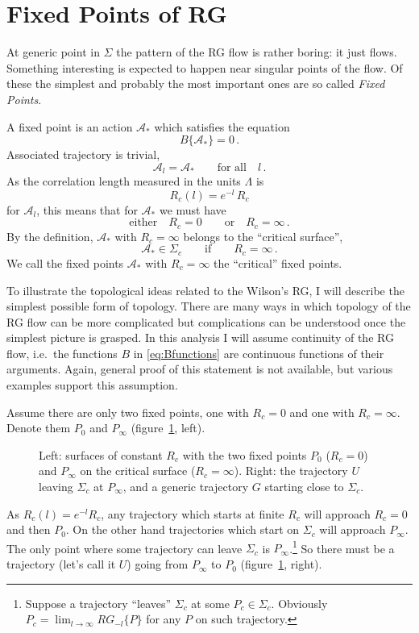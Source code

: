 \section{Fixed Points of RG}

At generic point in $\Sigma$ the pattern of the RG flow is rather boring: it just
flows. Something interesting is expected to happen near singular points of the
flow. Of these the simplest and probably the most important ones are so called
\emph{Fixed Points}.

A fixed point is an action $\mathcal A_*$ which satisfies the equation
\[
B\{\mathcal A_*\}=0\,.
\]
Associated trajectory is trivial,
\[
\mathcal A_l=\mathcal A_*\qquad\text{for all}\quad l\,.
\]
As the correlation length measured in the units $\Lambda$ is
\[
R_c(l)=e^{-l}\,R_c
\]
for $\mathcal A_l$, this means that for $\mathcal A_*$ we must have
\[
\text{either}\quad R_c=0\qquad\text{or}\quad R_c=\infty\,.
\]
By the definition, $\mathcal A_*$ with $R_c=\infty$ belongs to the ``critical
surface'',
\[
\mathcal A_*\in\Sigma_c\qquad\text{if}\qquad R_c=\infty\,.
\]
We call the fixed points $\mathcal A_*$ with $R_c=\infty$ the ``critical'' fixed
points.

To illustrate the topological ideas related to the Wilson's RG, I will describe
the simplest possible form of topology. There are many ways in which topology of
the RG flow can be more complicated but complications can be understood once the
simplest picture is grasped. In this analysis I will assume continuity of the RG
flow, i.e.\ the functions $B$ in \eqref{eq:Bfunctions} are continuous functions of
their arguments. Again, general proof of this statement is not available, but
various examples support this assumption.

Assume there are only two fixed points, one with $R_c=0$ and one with
$R_c=\infty$. Denote them $P_0$ and $P_\infty$ (figure~\ref{fig:twofixed}, left).
\begin{figure}[ht]
\centering{}
\caption{Left: surfaces of constant $R_c$ with the two fixed points $P_0$
($R_c=0$) and $P_\infty$ on the critical surface ($R_c=\infty$). Right: the
trajectory $U$ leaving $\Sigma_c$ at $P_\infty$, and a generic trajectory $G$
starting close to $\Sigma_c$.}
\label{fig:twofixed}
\end{figure}

As $R_c(l)=e^{-l}R_c$, any trajectory which starts at finite $R_c$ will approach
$R_c=0$ and then $P_0$. On the other hand trajectories which start on $\Sigma_c$
will approach $P_\infty$. The only point where some trajectory can leave
$\Sigma_c$ is $P_\infty$.\footnote{Suppose a trajectory ``leaves'' $\Sigma_c$ at
some $P_c\in\Sigma_c$. Obviously $P_c=\lim_{l\to\infty}RG_{-l}\{P\}$ for any $P$ on
such trajectory.} So there must be a trajectory (let's call it $U$) going from
$P_\infty$ to $P_0$ (figure~\ref{fig:twofixed}, right).

